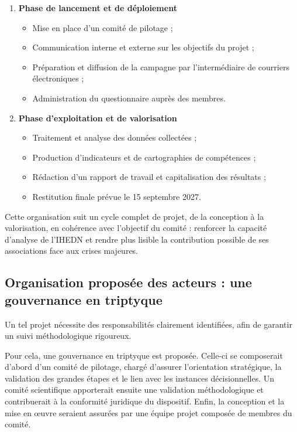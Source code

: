 \begin{enumerate}
    \item \textbf{Phase de lancement et de déploiement}
    \begin{itemize}
        \item Mise en place d'un comité de pilotage ;
        \item Communication interne et externe sur les objectifs du projet ;
        \item Préparation et diffusion de la campagne par l'intermédiaire de courriers électroniques ;
        \item Administration du questionnaire auprès des membres.
    \end{itemize}

\clearpage

    \item \textbf{Phase d'exploitation et de valorisation}
    \begin{itemize}
        \item Traitement et analyse des données collectées ;
        \item Production d'indicateurs et de cartographies de compétences ;
        \item Rédaction d'un rapport de travail et capitalisation des résultats ;
        \item Restitution finale prévue le 15 septembre 2027.
    \end{itemize}
\end{enumerate}

Cette organisation suit un cycle complet de projet, de la conception à la valorisation, en cohérence avec l'objectif du comité : renforcer la capacité d'analyse de l'IHEDN et rendre plus lisible la contribution possible de ses associations face aux crises majeures.

\clearpage

\subsection{Organisation proposée des acteurs : une gouvernance en triptyque}

Un tel projet nécessite des responsabilités clairement identifiées, afin de garantir un suivi méthodologique rigoureux.

Pour cela, une gouvernance en triptyque est proposée. Celle-ci se composerait d'abord d'un comité de pilotage, chargé d'assurer l'orientation stratégique, la validation des grandes étapes et le lien avec les instances décisionnelles. Un comité scientifique apporterait ensuite une validation méthodologique et contribuerait à la conformité juridique du dispositif. Enfin, la conception et la mise en \oe{}uvre seraient assurées par une équipe projet composée de membres du comité.

